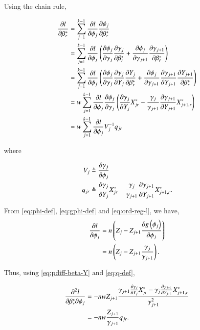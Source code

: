 \documentclass[journal,12pt,twocolumn]{IEEEtran}
\begin{document}
Using the chain rule,

\begin{align}
     \pdiff{\beta^*_r}{l} &= \sum_{j=1}^{k-1}\pdiff{\phi_j}{l}\pdiff{\beta^*_r}{\phi_j} \\
                          &= \sum_{j=1}^{k-1}\pdiff{\phi_j}{l}\brak{\pdiff{\gamma_j}{\phi_j}\pdiff{\beta^*_r}{\gamma_j} + \pdiff{\gamma_{j+1}}{\phi_j}\pdiff{\beta^*_r}{\gamma_{j+1}}} \\ 
                          &= \sum_{j=1}^{k-1}\pdiff{\phi_j}{l}\brak{\pdiff{\gamma_j}{\phi_j}\pdiff{Y_j}{\gamma_j}\pdiff{\beta_r^*}{Y_j} + \pdiff{\gamma_{j+1}}{\phi_j}\pdiff{Y_{j+1}}{\gamma_{j+1}}\pdiff{\beta^*_r}{Y_{j+1}}} \\ 
                          &= w\sum_{j=1}^{k-1}\pdiff{\phi_j}{l}\pdiff{\gamma_j}{\phi_j}\brak{\pdiff{Y_j}{\gamma_j}X_{jr}^* - \frac{\gamma_j}{\gamma_{j+1}}\pdiff{Y_{j+1}}{\gamma_{j+1}}X_{j+1,r}^*} \\
                          &= w\sum_{j=1}^{k-1}\pdiff{\phi_j}{l}V_j^{-1}q_{jr}
                          \label{eq:pdiff-beta-l}
\end{align}

where

\begin{align}
     V_j &\triangleq \pdiff{\phi_j}{\gamma_j} \label{eq:V-def} \\
     q_{jr} &\triangleq \pdiff{Y_j}{\gamma_j}X_{jr}^* - \frac{\gamma_j}{\gamma_{j+1}}\pdiff{Y_{j+1}}{\gamma_{j+1}}X_{j+1,r}^*. \label{eq:q-def}
\end{align}

From \eqref{eq:phi-def}, \eqref{eq:gphi-def} and \eqref{eq:ord-reg-l}, we have,
\begin{align}
     \pdiff{\phi_j}{l} &= n\brak{Z_j - Z_{j+1}\pdiff{\phi_j}{g\brak{\phi_j}}} \\
                       &= n\brak{Z_j - Z_{j+1}\frac{\gamma_j}{\gamma_{j+1}}}.
                       \label{eq:pdiff-phi-l}
\end{align}

Thus, using \eqref{eq:pdiff-beta-Y} and \eqref{eq:q-def},

\begin{align}
     \frac{\partial^2l}{\partial \beta_r^* \partial \phi_j} &= -nwZ_{j+1}\frac{\gamma_{j+1}\pdiff{Y_j}{\gamma_j}X_{jr}^* - \gamma_j\pdiff{Y_{j+1}}{\gamma_{j+1}}X_{j+1,r}^*}{\gamma_{j+1}^2} \\
                                                            &= -nw\frac{Z_{j+1}}{\gamma_{j+1}}q_{jr}.
                                                            \label{eq:pdiff-beta-phi-l}
\end{align}
\end{document}
